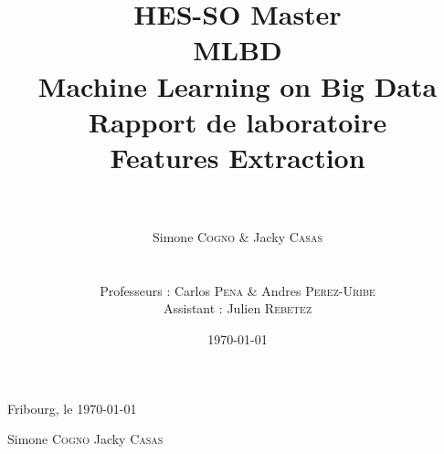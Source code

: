 \documentclass[a4paper, 12pt]{report}
\title{\huge{HES-SO Master} \\ \Huge{\textbf{\textsc{MLBD}}} \\
\LARGE{Machine Learning on Big Data} \\
\vspace{2cm} \huge{\textbf{Rapport de laboratoire}} \\ 
\huge{Features Extraction}}
\author{\\ \\ Simone \textsc{Cogno} \& Jacky \textsc{Casas} \\
\\ \\
Professeurs : Carlos \textsc{Pena} \& Andres \textsc{Perez-Uribe} \\
Assistant : Julien \textsc{Rebetez}}
\date{\today}
\begin{document}
\maketitle %
\newpage
\tableofcontents
\newpage

%


%
%


\vspace{3cm}
Fribourg, le \today

\vspace{1cm}

\hspace{2cm} Simone \textsc{Cogno} \hspace{4cm} Jacky \textsc{Casas}

\vspace{2cm}


%
\end{document}
